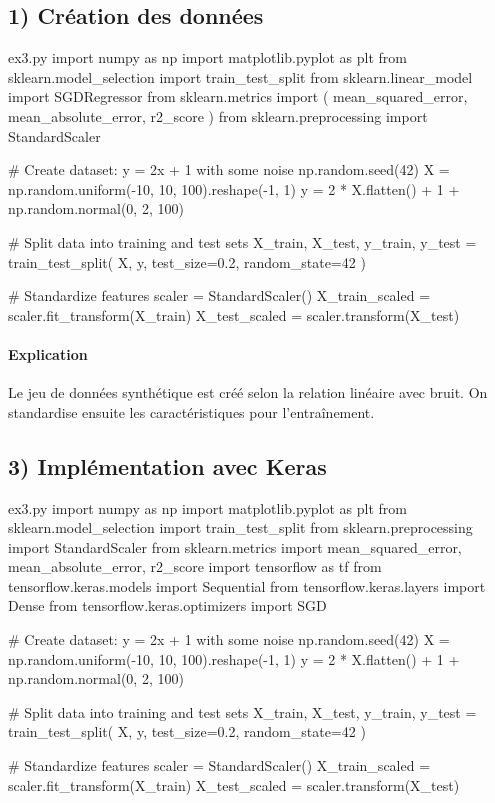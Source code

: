 \documentclass[12pt,a4paper]{article}
\begin{document}
\subsection*{1) Création des données}

\begin{codeholder}{ex3.py}
import numpy as np
import matplotlib.pyplot as plt
from sklearn.model_selection import train_test_split
from sklearn.linear_model import SGDRegressor
from sklearn.metrics import (
    mean_squared_error, mean_absolute_error, r2_score
)
from sklearn.preprocessing import StandardScaler

# Create dataset: y = 2x + 1 with some noise
np.random.seed(42)
X = np.random.uniform(-10, 10, 100).reshape(-1, 1)
y = 2 * X.flatten() + 1 + np.random.normal(0, 2, 100)

# Split data into training and test sets
X_train, X_test, y_train, y_test = train_test_split(
    X, y, test_size=0.2, random_state=42
)

# Standardize features
scaler         = StandardScaler()
X_train_scaled = scaler.fit_transform(X_train)
X_test_scaled  = scaler.transform(X_test)
\end{codeholder}

\paragraph{Explication}
Le jeu de données synthétique est créé selon la relation linéaire avec bruit.
On standardise ensuite les caractéristiques pour l'entraînement.


\subsection*{3) Implémentation avec Keras}

\begin{codeholder}{ex3.py}
import numpy as np
import matplotlib.pyplot as plt
from sklearn.model_selection import train_test_split
from sklearn.preprocessing import StandardScaler
from sklearn.metrics import mean_squared_error, mean_absolute_error, r2_score
import tensorflow as tf
from tensorflow.keras.models import Sequential
from tensorflow.keras.layers import Dense
from tensorflow.keras.optimizers import SGD

# Create dataset: y = 2x + 1 with some noise
np.random.seed(42)
X = np.random.uniform(-10, 10, 100).reshape(-1, 1)
y = 2 * X.flatten() + 1 + np.random.normal(0, 2, 100)

# Split data into training and test sets
X_train, X_test, y_train, y_test = train_test_split(
    X, y, test_size=0.2, random_state=42
)

# Standardize features
scaler = StandardScaler()
X_train_scaled = scaler.fit_transform(X_train)
X_test_scaled = scaler.transform(X_test)
\end{codeholder}
\end{document}
